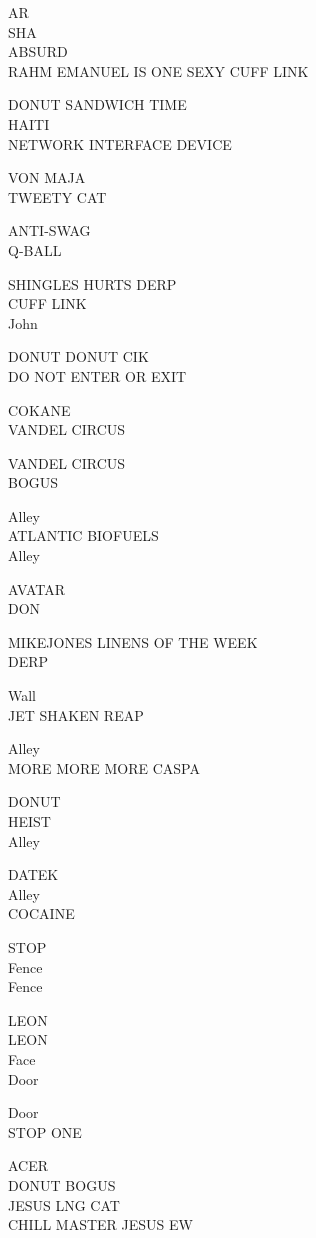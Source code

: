 \documentclass[10pt,letterpaper]{article}
\begin{document}
AR\\
SHA\\
ABSURD\\
RAHM EMANUEL IS ONE SEXY CUFF LINK

DONUT SANDWICH TIME\\
HAITI\\
NETWORK INTERFACE DEVICE

VON MAJA\\
TWEETY CAT

ANTI{-}SWAG\\
Q{-}BALL

SHINGLES HURTS DERP\\
CUFF LINK\\
John

DONUT DONUT CIK\\
DO NOT ENTER OR EXIT

COKANE\\
VANDEL CIRCUS

VANDEL CIRCUS\\
BOGUS

Alley\\
ATLANTIC BIOFUELS\\
Alley

AVATAR\\
DON

MIKEJONES LINENS OF THE WEEK\\
DERP

Wall\\
JET SHAKEN REAP

Alley\\
MORE MORE MORE CASPA

DONUT\\
HEIST\\
Alley

DATEK\\
Alley\\
COCAINE

STOP\\
Fence\\
Fence

LEON\\
LEON\\
Face\\
Door

Door\\
STOP ONE

ACER\\
DONUT BOGUS\\
JESUS LNG CAT\\
CHILL MASTER JESUS EW
\
\end{document}
